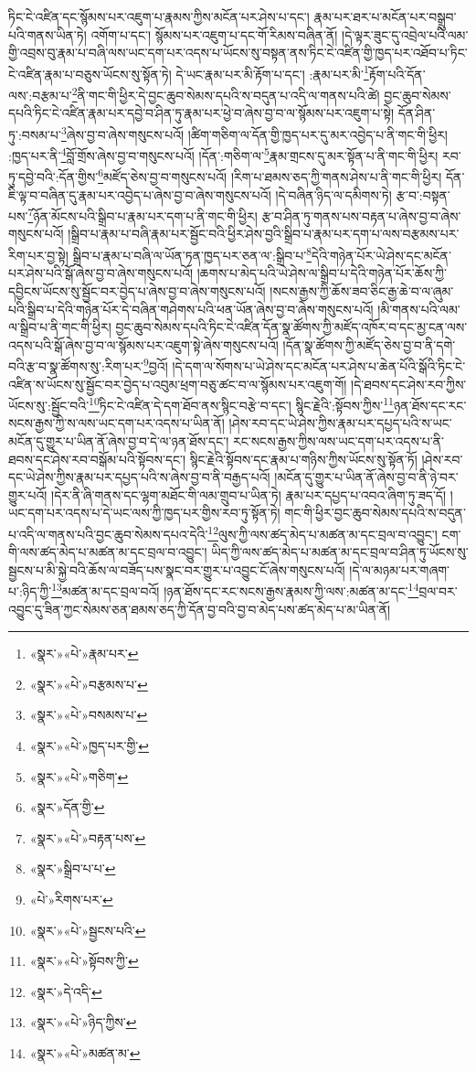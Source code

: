 ཏིང་ངེ་འཛིན་དང་སྙོམས་པར་འཇུག་པ་རྣམས་ཀྱིས་མངོན་པར་ཤེས་པ་དང་། རྣམ་པར་ཐར་པ་མངོན་པར་བསྒྲུབ་པའི་གནས་ཡིན་ཏེ། འགོག་པ་དང་། སྙོམས་པར་འཇུག་པ་དང་གོ་རིམས་བཞིན་ནོ། །དེ་ལྟར་ཟུང་དུ་འབྲེལ་པའི་ལམ་གྱི་འབྲས་བུ་རྣམ་པ་བཞི་ལས་ཡང་དག་པར་འདས་པ་ཡོངས་སུ་བསྟན་ནས་ཏིང་ངེ་འཛིན་གྱི་ཁྱད་པར་འཐོབ་པ་ཏིང་ངེ་འཛིན་རྣམ་པ་བཅུས་ཡོངས་སུ་སྟོན་ཏེ། དེ་ཡང་རྣམ་པར་མི་རྟོག་པ་དང་། :རྣམ་པར་མི་\footnote{«སྣར་»«པེ་»རྣམ་པར་}རྟོག་པའི་དོན་ལས་:བརྩམ་པ་\footnote{«སྣར་»«པེ་»བརྩམས་པ་}ནི་གང་གི་ཕྱིར་དེ་བྱང་ཆུབ་སེམས་དཔའི་ས་བདུན་པ་འདི་ལ་གནས་པའི་ཚེ། བྱང་ཆུབ་སེམས་དཔའི་ཏིང་ངེ་འཛིན་རྣམ་པར་དབྱེ་བ་ཤིན་ཏུ་རྣམ་པར་ཕྱེ་བ་ཞེས་བྱ་བ་ལ་སྙོམས་པར་འཇུག་པ་སྟེ། དོན་ཤིན་ཏུ་:བསམ་པ་\footnote{«སྣར་»«པེ་»བསམས་པ་}ཞེས་བྱ་བ་ཞེས་གསུངས་པའོ། །ཚིག་གཅིག་ལ་དོན་གྱི་ཁྱད་པར་དུ་མར་འབྱེད་པ་ནི་གང་གི་ཕྱིར། :ཁྱད་པར་ནི་\footnote{«སྣར་»«པེ་»ཁྱད་པར་གྱི་}བློ་གྲོས་ཞེས་བྱ་བ་གསུངས་པའོ། །དོན་:གཅིག་ལ་\footnote{«སྣར་»«པེ་»གཅིག་}རྣམ་གྲངས་དུ་མར་སྟོན་པ་ནི་གང་གི་ཕྱིར། རབ་ཏུ་དབྱེ་བའི་:དོན་གྱིས་\footnote{«སྣར་»དོན་གྱི་}མཛོད་ཅེས་བྱ་བ་གསུངས་པའོ། །རིག་པ་ཐམས་ཅད་ཀྱི་གནས་ཤེས་པ་ནི་གང་གི་ཕྱིར། དོན་ཇི་ལྟ་བ་བཞིན་དུ་རྣམ་པར་འབྱེད་པ་ཞེས་བྱ་བ་ཞེས་གསུངས་པའོ། །དེ་བཞིན་ཉིད་ལ་དམིགས་ཏེ། རྩ་བ་:བསྟན་པས་\footnote{«སྣར་»«པེ་»བརྟན་པས་}ཉོན་མོངས་པའི་སྒྲིབ་པ་རྣམ་པར་དག་པ་ནི་གང་གི་ཕྱིར། རྩ་བ་ཤིན་ཏུ་གནས་པས་བརྟན་པ་ཞེས་བྱ་བ་ཞེས་གསུངས་པའོ། །སྒྲིབ་པ་རྣམ་པ་བཞི་རྣམ་པར་སྦྱོང་བའི་ཕྱིར་ཤེས་བྱའི་སྒྲིབ་པ་རྣམ་པར་དག་པ་ལས་བརྩམས་པར་རིག་པར་བྱ་སྟེ། སྒྲིབ་པ་རྣམ་པ་བཞི་ལ་ཡོན་ཏན་ཁྱད་པར་ཅན་ལ་:སྒྲིབ་པ་\footnote{«སྣར་»སྒྲིབ་པ་པ་}དེའི་གཉེན་པོར་ཡེ་ཤེས་དང་མངོན་པར་ཤེས་པའི་སྒོ་ཞེས་བྱ་བ་ཞེས་གསུངས་པའོ། །ཆགས་པ་མེད་པའི་ཡེ་ཤེས་ལ་སྒྲིབ་པ་དེའི་གཉེན་པོར་ཆོས་ཀྱི་དབྱིངས་ཡོངས་སུ་སྦྱོང་བར་བྱེད་པ་ཞེས་བྱ་བ་ཞེས་གསུངས་པའོ། །སངས་རྒྱས་ཀྱི་ཆོས་ཟབ་ཅིང་རྒྱ་ཆེ་བ་ལ་ཞུམ་པའི་སྒྲིབ་པ་དེའི་གཉེན་པོར་དེ་བཞིན་གཤེགས་པའི་ཕན་ཡོན་ཞེས་བྱ་བ་ཞེས་གསུངས་པའོ། །མི་གནས་པའི་ལམ་ལ་སྒྲིབ་པ་ནི་གང་གི་ཕྱིར། བྱང་ཆུབ་སེམས་དཔའི་ཏིང་ངེ་འཛིན་དོན་སྣ་ཚོགས་ཀྱི་མཛོད་འཁོར་བ་དང་མྱ་ངན་ལས་འདས་པའི་སྒོ་ཞེས་བྱ་བ་ལ་སྙོམས་པར་འཇུག་སྟེ་ཞེས་གསུངས་པའོ། །དོན་སྣ་ཚོགས་ཀྱི་མཛོད་ཅེས་བྱ་བ་ནི་དགེ་བའི་རྩ་བ་སྣ་ཚོགས་སུ་:རིག་པར་\footnote{«པེ་»རིགས་པར་}བྱའོ། །དེ་དག་ལ་སོགས་པ་ཡེ་ཤེས་དང་མངོན་པར་ཤེས་པ་ཆེན་པོའི་སྒོའི་ཏིང་ངེ་འཛིན་ས་ཡོངས་སུ་སྦྱོང་བར་བྱེད་པ་འབུམ་ཕྲག་བཅུ་ཚང་བ་ལ་སྙོམས་པར་འཇུག་གོ། །དེ་ཐབས་དང་ཤེས་རབ་ཀྱིས་ཡོངས་སུ་:སྦྱོང་བའི་\footnote{«སྣར་»«པེ་»སྦྱངས་པའི་}ཏིང་ངེ་འཛིན་དེ་དག་ཐོབ་ནས་སྙིང་བརྩེ་བ་དང་། སྙིང་རྗེའི་:སྟོབས་ཀྱིས་\footnote{«སྣར་»«པེ་»སྟོབས་ཀྱི་}ཉན་ཐོས་དང་རང་སངས་རྒྱས་ཀྱི་ས་ལས་ཡང་དག་པར་འདས་པ་ཡིན་ནོ། །ཤེས་རབ་དང་ཡེ་ཤེས་ཀྱིས་རྣམ་པར་དཔྱད་པའི་ས་ཡང་མངོན་དུ་གྱུར་པ་ཡིན་ནོ་ཞེས་བྱ་བ་དེ་ལ་ཉན་ཐོས་དང་། རང་སངས་རྒྱས་ཀྱིས་ལས་ཡང་དག་པར་འདས་པ་ནི་ཐབས་དང་ཤེས་རབ་བསྒོམ་པའི་སྟོབས་དང་། སྙིང་རྗེའི་སྟོབས་དང་རྣམ་པ་གཉིས་ཀྱིས་ཡོངས་སུ་སྟོན་ཏོ། །ཤེས་རབ་དང་ཡེ་ཤེས་ཀྱིས་རྣམ་པར་དཔྱད་པའི་ས་ཞེས་བྱ་བ་ནི་བརྒྱད་པའོ། །མངོན་དུ་གྱུར་པ་ཡིན་ནོ་ཞེས་བྱ་བ་ནི་ཉེ་བར་གྱུར་པའོ། །དེར་ནི་ཞི་གནས་དང་ལྷག་མཐོང་གི་ལམ་གྲུབ་པ་ཡིན་ཏེ། རྣམ་པར་དཔྱད་པ་འབའ་ཞིག་ཏུ་ཟད་དོ། །ཡང་དག་པར་འདས་པ་དེ་ཡང་ལས་ཀྱི་ཁྱད་པར་གྱིས་རབ་ཏུ་སྟོན་ཏེ། གང་གི་ཕྱིར་བྱང་ཆུབ་སེམས་དཔའི་ས་བདུན་པ་འདི་ལ་གནས་པའི་བྱང་ཆུབ་སེམས་དཔའ་དེའི་\footnote{«སྣར་»དེ་འདི་}ལུས་ཀྱི་ལས་ཚད་མེད་པ་མཚན་མ་དང་བྲལ་བ་འབྱུང་། ངག་གི་ལས་ཚད་མེད་པ་མཚན་མ་དང་བྲལ་བ་འབྱུང་། ཡིད་ཀྱི་ལས་ཚད་མེད་པ་མཚན་མ་དང་བྲལ་བ་ཤིན་ཏུ་ཡོངས་སུ་སྦྱངས་པ་མི་སྐྱེ་བའི་ཆོས་ལ་བཟོད་པས་སྣང་བར་གྱུར་པ་འབྱུང་ངོ་ཞེས་གསུངས་པའོ། །དེ་ལ་མཉམ་པར་གཞག་པ་:ཉིད་ཀྱི་\footnote{«སྣར་»«པེ་»ཉིད་ཀྱིས་}མཚན་མ་དང་བྲལ་བའོ། །ཉན་ཐོས་དང་རང་སངས་རྒྱས་རྣམས་ཀྱི་ལས་:མཚན་མ་དང་\footnote{«སྣར་»«པེ་»མཚན་མ་}བྲལ་བར་འབྱུང་དུ་ཟིན་ཀྱང་སེམས་ཅན་ཐམས་ཅད་ཀྱི་དོན་བྱ་བའི་བྱ་བ་མེད་པས་ཚད་མེད་པ་མ་ཡིན་ནོ། 